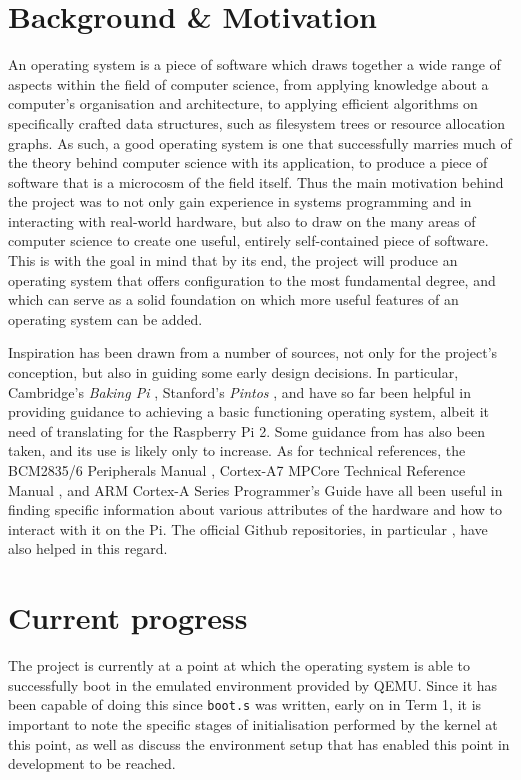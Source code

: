 \documentclass[10pt,a4paper]{article}
\newcommand{\code}[1]{\texttt{#1}}
\begin{document}
\section*{Background \& Motivation}
An operating system is a piece of software which draws together a wide range of
aspects within the field of computer science, from applying knowledge about a
computer's organisation and architecture, to applying efficient algorithms on
specifically crafted data structures, such as filesystem trees or resource
allocation graphs. As such, a good
operating system is one that successfully marries much of the theory behind
computer science with its application, to produce a piece of software that is a
microcosm of the field itself. Thus the main motivation behind the project was
to not only gain experience in systems programming and in interacting with
real-world hardware, but also to draw on the many areas of computer science to
create one useful, entirely self-contained piece of software. This is with the
goal in mind that by its end, the project will produce an operating system that
offers configuration to the most fundamental degree, and which can serve as a
solid foundation on which more useful features of an operating system can be
added.

Inspiration has been drawn from a number of sources, not only for the project's
conception, but also in guiding some early design decisions. In particular,
Cambridge's \textit{Baking Pi} \cite{BakingPi}, Stanford's \textit{Pintos}
\cite{Pintos}, and \cite{jsandler} have so far been helpful in providing
guidance to achieving a basic functioning operating system, albeit it need of
translating for the Raspberry Pi 2. Some guidance from \cite{littleosbook} has
also been taken, and its use is likely only to increase. As for technical
references, the BCM2835/6 Peripherals Manual \cite{BCM2835, BCM2836}, Cortex-A7
MPCore Technical Reference Manual \cite{TRM}, and ARM Cortex-A Series
Programmer's Guide \cite{PG} have all been useful in finding specific
information about various attributes of the hardware and how to interact with it
on the Pi. The official Github repositories, in particular
\cite{PiDocumentation}, have also helped in this regard.

\section*{Current progress}
The project is currently at a point at which the operating system is able to
successfully boot in the emulated environment provided by QEMU. Since it has
been capable of doing this since \code{boot.s} was written, early on in Term 1,
it is important to note the specific stages of initialisation performed by the
kernel at this point, as well as discuss the environment setup that has enabled
this point in development to be reached.
\end{document}
